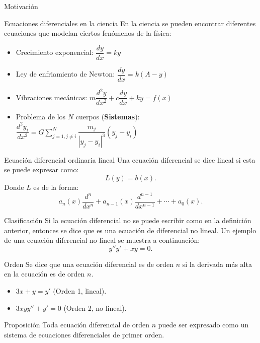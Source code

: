 \begin{frame}{Motivación}
\small
\begin{block}{Ecuaciones diferenciales en la ciencia}
En la ciencia se pueden encontrar diferentes ecuaciones que modelan ciertos fenómenos de la física:\pause
\begin{itemize}
\item Crecimiento exponencial: \textbf{$\dfrac{dy}{dx}=ky$}
\item Ley de enfriamiento de Newton: \textbf{$\dfrac{dy}{dx}=k(A-y)$}
\item Vibraciones mecánicas: \textbf{$m\dfrac{d^2y}{dx^2}+c\dfrac{dy}{dx}
+ky=f(x)$}
\item Problema de los $N$ cuerpos (\textbf{Sistemas}): \textbf{$\dfrac{d^2y_i}{dx^2}=G\sum_{j=1,j\neq i}^{N}\dfrac{m_j}{|y_j-y_i|^3}(y_j-y_i)$}
\end{itemize}
\end{block}\pause
\begin{block}{Ecuación diferencial ordinaria lineal}
Una ecuación diferencial se dice lineal si esta se puede expresar como:
$$L(y)=b(x).$$
Donde $L$ es de la forma:
$$a_n(x)\dfrac{d^n}{dx^n}+a_{n-1}(x)\dfrac{d^{n-1}}{dx^{n-1}}+\cdots+a_0(x).$$
\end{block}
\end{frame}
\begin{frame}{Clasificación}
Si la ecuación diferencial no se puede escribir como en la definición anterior, entonces se dice que es una ecuación de diferencial no lineal. Un ejemplo de una ecuación diferencial no lineal se muestra a continuación:
$$y''y'+xy=0.$$
\begin{block}{Orden}
Se dice que una ecuación diferencial es de orden $n$ si la derivada más alta en la ecuación es de orden $n$.
\end{block}\pause
\begin{itemize}
\item $3x+y=y'$ (Orden 1, lineal).
\item $3xyy''+y'=0$ (Orden 2, no lineal).
\end{itemize}
\begin{block}{Proposición}
Toda ecuación diferencial de orden $n$ puede ser expresado como un sistema de ecuaciones diferenciales de primer orden. 
\end{block}
\end{frame}
